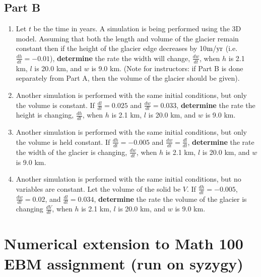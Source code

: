 \documentclass{exam}
\begin{document}
\subsection*{Part B}

\begin{enumerate}
    \item Let $t$ be the time in years. A simulation is being performed using the 3D model.  Assuming that both the length and volume of the glacier remain constant then if the height of the glacier edge decreases by 10$\rm m/yr$ (i.e. $\frac{dh}{dt}=-0.01$), \textbf{determine} the rate the width will change, $\frac{dw}{dt}$, when $h$ is 2.1 km, $l$ is 20.0 km, and $w$ is 9.0 km. (Note for instructors: if Part B is done separately from Part A, then the volume of the glacier should be given).



    \item Another simulation is performed with the same initial conditions, but only the volume is constant. If $\frac{dl}{dt}=0.025$ and $\frac{dw}{dt}=0.033$, \textbf{determine}  the rate the height is changing, $\frac{dh}{dt}$, when $h$ is 2.1 km, $l$ is 20.0 km, and $w$ is 9.0 km.



    \item Another simulation is performed with the same initial conditions, but only the volume is held constant. If $\frac{dh}{dt}=-0.005$ and $\frac{dw}{dt}=\frac{dl}{dt}$, \textbf{determine} the rate the width of the glacier is changing, $\frac{dw}{dt}$, when $h$ is 2.1 km, $l$ is 20.0 km, and $w$ is 9.0 km.



    \item Another simulation is performed with the same initial conditions, but no variables are constant. Let the volume of the solid be $V$. If $\frac{dh}{dt}=-0.005$, $\frac{dw}{dt}=0.02$,  and $\frac{dl}{dt}=0.034$, \textbf{determine} the rate the volume of the glacier is changing $\frac{dV}{dt}$, when $h$ is 2.1 km, $l$ is 20.0 km, and $w$ is 9.0 km.


    
\end{enumerate}


\section{Numerical extension to Math 100 EBM assignment (run on syzygy)}\label{energy-balance-model-numerical-exploration-designed-to-accompany-math-100-assignment}
\end{document}
